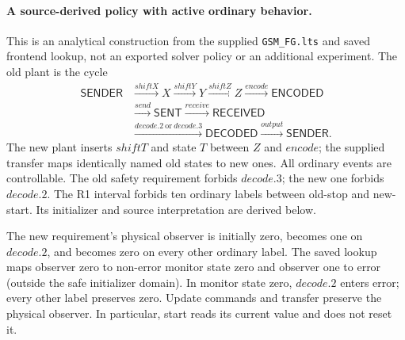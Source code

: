 \paragraph{A source-derived policy with active ordinary behavior.}
\label{ta:gsm-active-policy}
This is an analytical construction from the supplied \texttt{GSM\_FG.lts} and saved frontend lookup, not an exported solver policy or an additional experiment. The old plant is the cycle
\[
\begin{aligned}
\mathsf{SENDER}&\xrightarrow{shiftX}X\xrightarrow{shiftY}Y
\xrightarrow{shiftZ}Z\xrightarrow{encode}\mathsf{ENCODED}\\
&\xrightarrow{send}\mathsf{SENT}\xrightarrow{receive}\mathsf{RECEIVED}\\
&\xrightarrow{decode.2\ \mathrm{or}\ decode.3}\mathsf{DECODED}
\xrightarrow{output}\mathsf{SENDER}.
\end{aligned}
\]
The new plant inserts $shiftT$ and state $T$ between $Z$ and $encode$; the supplied transfer maps identically named old states to new ones. All ordinary events are controllable. The old safety requirement forbids $decode.3$; the new one forbids $decode.2$. The R1 interval forbids ten ordinary labels between old-stop and new-start. Its initializer and source interpretation are derived below.

The new requirement's physical observer is initially zero, becomes one on $decode.2$, and becomes zero on every other ordinary label. The saved lookup maps observer zero to non-error monitor state zero and observer one to error (outside the safe initializer domain). In monitor state zero, $decode.2$ enters error; every other label preserves zero. Update commands and transfer preserve the physical observer. In particular, start reads its current value and does not reset it.

